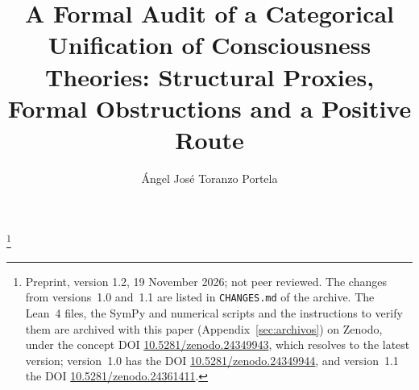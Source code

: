 \documentclass[a4paper,onecolumn,superscriptaddress,10pt,unpublished]{compositionalityarticle}
\begin{document}
\title{A Formal Audit of a Categorical Unification of Consciousness Theories: Structural Proxies, Formal Obstructions and a Positive Route}
\author{\'Angel Jos\'e Toranzo Portela}
\thanks{Preprint, version 1.2, 19 November 2026; not peer reviewed. The changes from versions~1.0 and~1.1 are listed in \texttt{CHANGES.md} of the archive. The Lean~4 files, the SymPy and numerical scripts and the instructions to verify them are archived with this paper (Appendix~\ref{sec:archivos}) on Zenodo, under the concept DOI \href{https://doi.org/10.5281/zenodo.24349943}{10.5281/zenodo.24349943}, which resolves to the latest version; version~1.0 has the DOI \href{https://doi.org/10.5281/zenodo.24349944}{10.5281/zenodo.24349944}, and version~1.1 the DOI \href{https://doi.org/10.5281/zenodo.24361411}{10.5281/zenodo.24361411}.}
\maketitle{}
\end{document}
